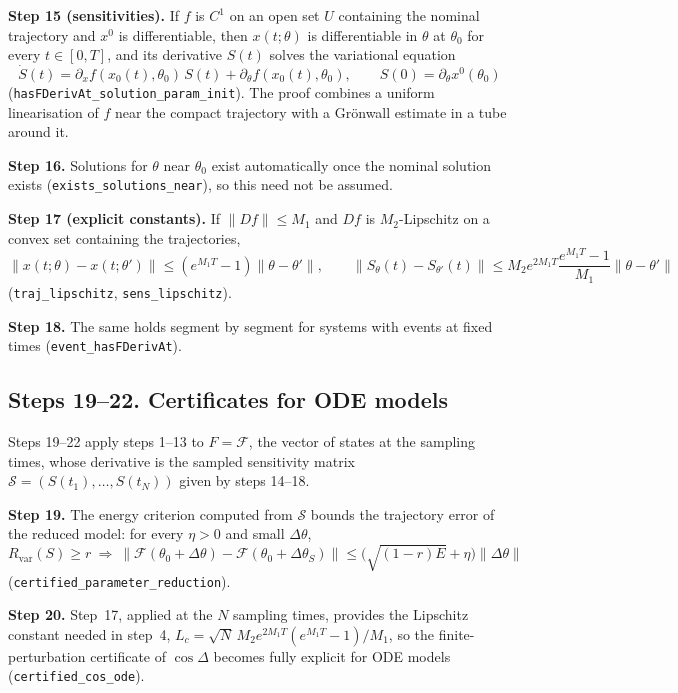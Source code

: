 \textbf{Step 15 (sensitivities).} If $f$ is $C^1$ on an open set $U$ containing the nominal trajectory and $x^0$ is differentiable, then $x(t;\theta)$ is differentiable in $\theta$ at $\theta_0$ for every $t\in[0,T]$, and its derivative $S(t)$ solves the variational equation
\[
\dot S(t)=\partial_xf(x_0(t),\theta_0)\,S(t)+\partial_\theta f(x_0(t),\theta_0),\qquad S(0)=\partial_\theta x^0(\theta_0)
\]
(\texttt{hasFDerivAt\_solution\_param\_init}). The proof combines a uniform linearisation of $f$ near the compact trajectory with a Grönwall estimate in a tube around it.

\textbf{Step 16.} Solutions for $\theta$ near $\theta_0$ exist automatically once the nominal solution exists (\texttt{exists\_solutions\_near}), so this need not be assumed.

\textbf{Step 17 (explicit constants).} If $\|Df\|\le M_1$ and $Df$ is $M_2$-Lipschitz on a convex set containing the trajectories,
\[
\|x(t;\theta)-x(t;\theta')\|\le(e^{M_1T}-1)\|\theta-\theta'\|,\qquad \|S_\theta(t)-S_{\theta'}(t)\|\le M_2e^{2M_1T}\frac{e^{M_1T}-1}{M_1}\|\theta-\theta'\|
\]
(\texttt{traj\_lipschitz}, \texttt{sens\_lipschitz}).

\textbf{Step 18.} The same holds segment by segment for systems with events at fixed times (\texttt{event\_hasFDerivAt}).

\subsection*{Steps 19--22. Certificates for ODE models}

Steps 19--22 apply steps 1--13 to $F=\mathcal{F}$, the vector of states at the sampling times, whose derivative is the sampled sensitivity matrix $\mathcal{S}=(S(t_1),\dots,S(t_N))$ given by steps 14--18.

\textbf{Step 19.} The energy criterion computed from $\mathcal{S}$ bounds the trajectory error of the reduced model: for every $\eta>0$ and small $\Delta\theta$,
\[
R_{\mathrm{var}}(S)\ge r\ \Rightarrow\ \|\mathcal F(\theta_0+\Delta\theta)-\mathcal F(\theta_0+\Delta\theta_S)\|\le\bigl(\sqrt{(1-r)E}+\eta\bigr)\|\Delta\theta\|
\]
(\texttt{certified\_parameter\_reduction}).

\textbf{Step 20.} Step~17, applied at the $N$ sampling times, provides the Lipschitz constant needed in step~4, $L_c=\sqrt N\,M_2e^{2M_1T}(e^{M_1T}-1)/M_1$, so the finite-perturbation certificate of $\cos\Delta$ becomes fully explicit for ODE models (\texttt{certified\_cos\_ode}).

